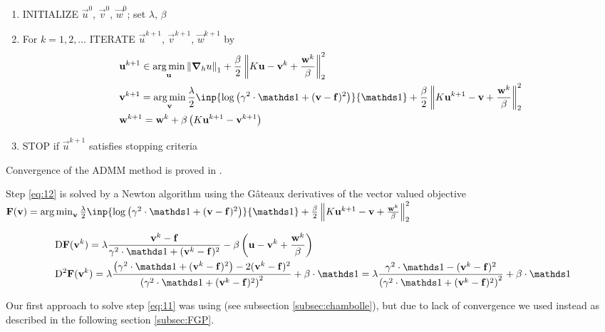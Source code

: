 \begin{enumerate}
\item INITIALIZE $\vec{u}^0$, $\vec{v}^0$, $\vec{w}^0$; set $\lambda$, $\beta$
\item For $k = 1,2,\ldots$ ITERATE $\vec{u}^{k+1}$, $\vec{v}^{k+1}$, $\vec{w}^{k+1}$ by
\begin{align}
    &\vec{u}^{k+1} \in \argmin_{\vec{u}} \norm{\grad{u}{h}}_1 + \frac{\beta}{2} \norm{K \vec{u}-\vec{v}^k+\frac{\vec{w}^k}{\beta}}_2^2 \label{eq:11}\\
    &\vec{v}^{k+1} = \argmin_{\vec{v}} \frac{\lambda}{2} \inp{\log \left(\gamma^2 \cdot \one + (\vec{v}-\vec{f})^2 \right)}{\one} + \frac{\beta}{2} \norm{K \vec{u}^{k+1} - \vec{v} + \frac{\vec{w}^k}{\beta}}_2^2 \label{eq:12}\\
    &\vec{w}^{k+1} = \vec{w}^k + \beta \left(K \vec{u}^{k+1} - \vec{v}^{k+1} \right) \label{eq:13}
\end{align}
\item STOP if $\vec{u}^{k+1}$ satisfies stopping criteria
\end{enumerate}

Convergence of the ADMM method is proved in \cite[Theorem 4.2]{MR3761275}.

Step \ref{eq:12} is solved by a Newton algorithm using the G\^ateaux derivatives of the vector valued objective $\vec{F}(\vec{v}) = \argmin_{\vec{v}} \frac{\lambda}{2} \inp{\log \left(\gamma^2 \cdot \one + (\vec{v}-\vec{f})^2 \right)}{\one} + \frac{\beta}{2} \norm{K \vec{u}^{k+1} - \vec{v} + \frac{\vec{w}^k}{\beta}}_2^2$

\begin{align}
    &\Gdiff \vec{F}(\vec{v}^k) = \lambda \frac{\vec{v}^k-\vec{f}}{\gamma^2 \cdot \one + (\vec{v}^k-\vec{f})^2} - \beta \left(\vec{u}-\vec{v}^k+\frac{\vec{w}^k}{\beta}\right) \\
    &\Gdiff^2 \vec{F}(\vec{v}^k) = \lambda \frac{\left(\gamma^2 \cdot \one + (\vec{v}^k-\vec{f})^2\right) - 2(\vec{v}^k-\vec{f})^2}{\left(\gamma^2 \cdot \one + (\vec{v}^k-\vec{f})^2\right)^2} + \beta \cdot \one = \lambda \frac{\gamma^2 \cdot \one - (\vec{v}^k-\vec{f})^2}{\left(\gamma^2 \cdot \one + (\vec{v}^k-\vec{f})^2\right)^2} + \beta \cdot \one
\end{align}

Our first approach to solve step \ref{eq:11} was using \cite{MR2049783} (see subsection \ref{subsec:chambolle}), but due to lack of convergence we used \cite{MR2722312} instead as described in the following section \ref{subsec:FGP}.

